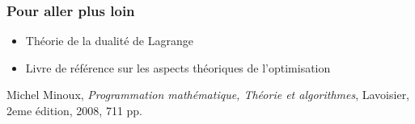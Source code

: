 \documentclass{beamer}
\begin{document}
\begin{frame}
  \frametitle{Pour aller plus loin}

  \begin{itemize}
  \item Théorie de la dualité de Lagrange
  \end{itemize}


  \begin{itemize}
  \item Livre de référence sur les aspects théoriques de l'optimisation
  \end{itemize}

\begin{thebibliography}{alpha}
Michel Minoux, \emph{Programmation mathématique, Théorie et algorithmes}, Lavoisier, 2eme édition, 2008, 711 pp.
\end{thebibliography}

\end{frame}
\end{document}
